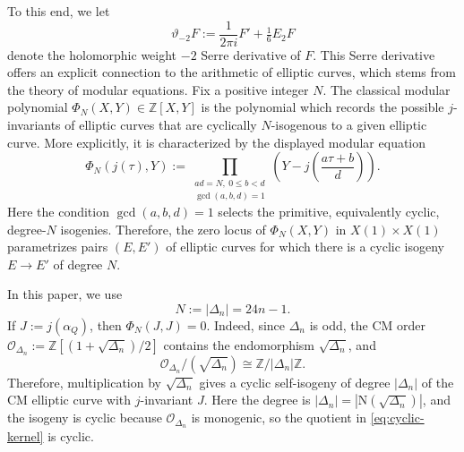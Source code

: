 \documentclass[12pt]{amsart}
\theoremstyle{definition}
\theoremstyle{remark}
\newcommand{\Z}{\mathbb{Z}}
\begin{document}
 To this end, we let
$$\vartheta_{-2}F:=\frac{1}{2\pi i}F'+\tfrac16E_2F
$$
denote the holomorphic weight $-2$ Serre derivative of $F$.
This Serre derivative offers an explicit connection to the arithmetic of elliptic curves, which stems from the theory of modular equations.
 Fix a positive integer $N$. The classical modular polynomial
$\Phi_N(X,Y)\in\Z[X,Y]$ is the polynomial which records the possible $j$-invariants of
elliptic curves that are cyclically $N$-isogenous to a given elliptic curve. More explicitly,
it is characterized by the displayed modular equation
\begin{equation}\label{eq:modular-equation-def}
\Phi_N(j(\tau),Y):=
\prod_{\substack{ad=N,\ 0\le b<d\\ \gcd(a,b,d)=1}}
\left(Y-j\!\left(\frac{a\tau+b}{d}\right)\right).
\end{equation}
Here the condition $\gcd(a,b,d)=1$ selects the primitive, equivalently cyclic, degree-$N$
isogenies. Therefore, the zero locus of $\Phi_N(X,Y)$ in $X(1)\times X(1)$ parametrizes pairs
$(E,E')$ of elliptic curves for which there is a cyclic isogeny $E\to E'$ of degree $N$.

In this paper, we use
\begin{equation}\label{eq:N-Delta-def}
N:=|\Delta_n|=24n-1.
\end{equation}
If $J:=j(\alpha_Q)$, then $\Phi_N(J,J)=0$. Indeed, since $\Delta_n$ is odd, the CM order
$\mathcal O_{\Delta_n}:=\Z[(1+\sqrt{\Delta_n})/2]$ contains the endomorphism
$\sqrt{\Delta_n}$, and
\begin{equation}\label{eq:cyclic-kernel}
\mathcal O_{\Delta_n}/(\sqrt{\Delta_n})\cong \Z/|\Delta_n|\Z.
\end{equation}
Therefore, multiplication by $\sqrt{\Delta_n}$ gives a cyclic self-isogeny of degree
$|\Delta_n|$ of the CM elliptic curve with $j$-invariant $J$. Here the degree is
$|\Delta_n|=|\mathrm{N}(\sqrt{\Delta_n})|$, and the isogeny is cyclic because
$\mathcal O_{\Delta_n}$ is monogenic, so the quotient in \eqref{eq:cyclic-kernel} is cyclic.
\end{document}
